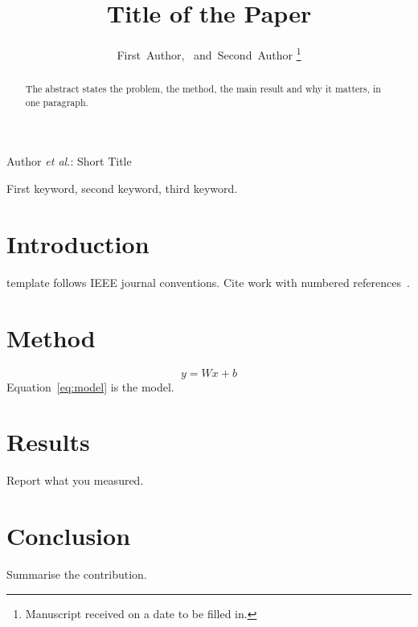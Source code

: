 \documentclass[journal]{IEEEtran}
\begin{document}
\title{Title of the Paper}
\author{First~Author,~
        and~Second~Author%
\thanks{Manuscript received on a date to be filled in.}}

%
{Author \MakeLowercase{\textit{et al.}}: Short Title}

\maketitle

\begin{abstract}
The abstract states the problem, the method, the main result and why it
matters, in one paragraph.
\end{abstract}

\begin{IEEEkeywords}
First keyword, second keyword, third keyword.
\end{IEEEkeywords}

\section{Introduction}
 template follows IEEE journal conventions. Cite work
with numbered references~\cite{knuth1984, lamport1994}.

\section{Method}
\begin{equation}
  y = W x + b
  \label{eq:model}
\end{equation}
Equation~\eqref{eq:model} is the model.

\section{Results}
Report what you measured.

\section{Conclusion}
Summarise the contribution.



\end{document}
